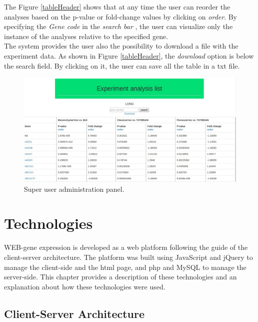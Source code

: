 \documentclass[a4paper]{report}
\begin{document}
The Figure \ref{tableHeader} shows that at any time the user can reorder the analyses based on the p-value or fold-change values by clicking on \emph{order}. By specifying the \emph{Gene code} in the \emph{search bar} , the user can visualize only the instance of the analyses relative to the specified gene.\\
The system provides the user also the possibility to download a file with the experiment data. As shown in Figure \ref{tableHeader}, the \emph{download} option is below the search field. By clicking on it, the user can save all the table in a txt file.


\begin{figure}[htb] 
\begin{center}
\includegraphics[scale=0.4]{figure/table.jpg} 
\end{center}
\caption{Super user administration panel.}
\label{table}
\end{figure}


\chapter{Technologies}
WEB-gene expression is developed as a web platform following the guide of the client-server architecture. The platform was built using JavaScript and jQuery to manage the client-side and the html page, and php and MySQL to manage the server-side. This chapter provides a description of these technologies and an explanation about how these technologies were used.

\section{Client-Server Architecture}
\end{document}
